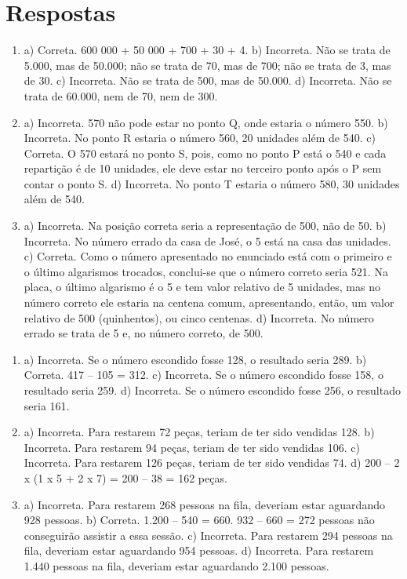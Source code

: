 \chapter{Respostas}
\pagestyle{plain}
\footnotesize

\pagecolor{gray!40}


\begin{enumerate}
\item 
a) Correta. 600 000 + 50 000 + 700 + 30 + 4.
b) Incorreta. Não se trata de 5.000, mas de 50.000; não se trata de 70, mas de 700; não se trata de 3, mas de 30.
c) Incorreta. Não se trata de 500, mas de 50.000.
d) Incorreta. Não se trata de 60.000, nem de 70, nem de 300.

\item
a) Incorreta. 570 não pode estar no ponto Q, onde estaria o número 550.
b) Incorreta. No ponto R estaria o número 560, 20 unidades além de 540.
c) Correta. O 570 estará no ponto S, pois, como no ponto P está o 540 e cada
repartição é de 10 unidades, ele deve estar no terceiro ponto após o P
sem contar o ponto S.
d) Incorreta. No ponto T estaria o número 580, 30 unidades além de 540.

\item
a) Incorreta. Na posição correta seria a representação de 500, não de 50.
b) Incorreta. No número errado da casa de José, o 5 está na casa das unidades.
c) Correta. Como o número apresentado no enunciado está com o primeiro e o último
algarismos trocados, conclui-se que o número correto seria 521. Na placa,
o último algarismo é o 5 e tem valor relativo de 5 unidades, mas no
número correto ele estaria na centena comum, apresentando, então, um valor
relativo de 500 (quinhentos), ou cinco centenas.
d) Incorreta. No número errado se trata de 5 e, no número correto, de 500.

\end{enumerate}


\begin{enumerate}
\item
a) Incorreta. Se  o número escondido fosse 128, o resultado seria 289.
b) Correta. 417 -- 105 = 312.
c) Incorreta. Se  o número escondido fosse 158, o resultado seria 259.
d) Incorreta. Se  o número escondido fosse 256, o resultado seria 161.

\item
a) Incorreta. Para restarem 72 peças, teriam de ter sido vendidas 128.
b) Incorreta. Para restarem 94 peças, teriam de ter sido vendidas 106.
c) Incorreta. Para restarem 126 peças, teriam de ter sido vendidas 74.
d) 200 -- 2 x (1 x 5 + 2 x 7) = 200 -- 38 = 162 peças.

\item
a) Incorreta. Para restarem 268 pessoas na fila, deveriam estar aguardando 928 pessoas.
b) Correta.
1.200 -- 540 = 660.
932 -- 660 = 272 pessoas não conseguirão assistir a essa sessão.
c) Incorreta. Para restarem 294 pessoas na fila, deveriam estar aguardando 954 pessoas.
d) Incorreta. Para restarem 1.440 pessoas na fila, deveriam estar aguardando 2.100 pessoas.
\end{enumerate}

